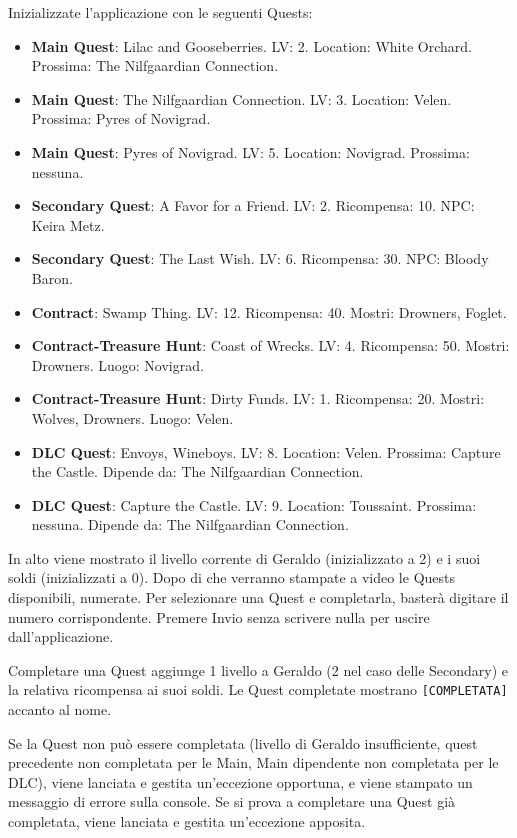 \documentclass[a4paper,12pt]{article}
\begin{document}
Inizializzate l'applicazione con le seguenti Quests: 

\begin{itemize}
    \item \textbf{Main Quest}: Lilac and Gooseberries. LV: 2. Location: White Orchard. Prossima: The Nilfgaardian Connection.
    \item \textbf{Main Quest}: The Nilfgaardian Connection. LV: 3. Location: Velen. Prossima: Pyres of Novigrad.
    \item \textbf{Main Quest}: Pyres of Novigrad. LV: 5. Location: Novigrad. Prossima: nessuna.
    \item \textbf{Secondary Quest}: A Favor for a Friend. LV: 2. Ricompensa: 10. NPC: Keira Metz.
    \item \textbf{Secondary Quest}: The Last Wish. LV: 6. Ricompensa: 30. NPC: Bloody Baron.
    \item \textbf{Contract}: Swamp Thing. LV: 12. Ricompensa: 40. Mostri: Drowners, Foglet.
    \item \textbf{Contract-Treasure Hunt}: Coast of Wrecks. LV: 4. Ricompensa: 50. Mostri: Drowners. Luogo: Novigrad.
    \item \textbf{Contract-Treasure Hunt}: Dirty Funds. LV: 1. Ricompensa: 20. Mostri: Wolves, Drowners. Luogo: Velen.
    \item \textbf{DLC Quest}: Envoys, Wineboys. LV: 8. Location: Velen. Prossima: Capture the Castle. Dipende da: The Nilfgaardian Connection. 
    \item \textbf{DLC Quest}: Capture the Castle. LV: 9. Location: Toussaint. Prossima: nessuna. Dipende da: The Nilfgaardian Connection.
\end{itemize}

In alto viene mostrato il livello corrente di Geraldo (inizializzato a 2) e i suoi soldi (inizializzati a 0). Dopo di che verranno stampate a video le Quests disponibili, numerate. Per selezionare una Quest e completarla, basterà digitare il numero corrispondente. Premere Invio senza scrivere nulla per uscire dall'applicazione.

Completare una Quest aggiunge 1 livello a Geraldo (2 nel caso delle Secondary) e la relativa ricompensa ai suoi soldi. Le Quest completate mostrano \texttt{[COMPLETATA]} accanto al nome.

Se la Quest non può essere completata (livello di Geraldo insufficiente, quest precedente non completata per le Main, Main dipendente non completata per le DLC), viene lanciata e gestita un'eccezione opportuna, e viene stampato un messaggio di errore sulla console. Se si prova a completare una Quest già completata, viene lanciata e gestita un'eccezione apposita.
\end{document}
